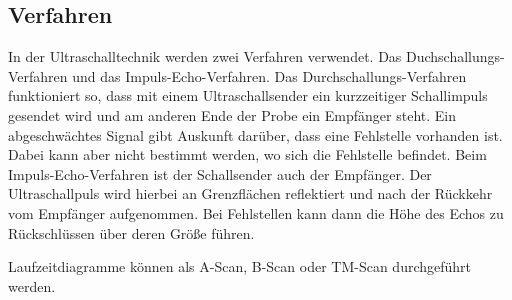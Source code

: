 \subsection{Verfahren}
In der Ultraschalltechnik werden zwei Verfahren verwendet. 
Das Duchschallungs-Verfahren und das Impuls-Echo-Verfahren. 
\newline
Das Durchschallungs-Verfahren funktioniert so, dass mit einem 
Ultraschallsender ein kurzzeitiger Schallimpuls gesendet wird 
und am anderen Ende der Probe ein Empfänger steht. Ein 
abgeschwächtes Signal gibt Auskunft darüber, dass eine 
Fehlstelle vorhanden ist. Dabei kann aber nicht bestimmt 
werden, wo sich die Fehlstelle befindet.
\newline
Beim Impuls-Echo-Verfahren ist der Schallsender auch der 
Empfänger. Der Ultraschallpuls wird hierbei an Grenzflächen 
reflektiert und nach der Rückkehr vom Empfänger aufgenommen. 
Bei Fehlstellen kann dann die Höhe des Echos zu Rückschlüssen 
über deren Größe führen. 

\noindent Laufzeitdiagramme können als A-Scan, B-Scan oder TM-Scan 
durchgeführt werden. %
